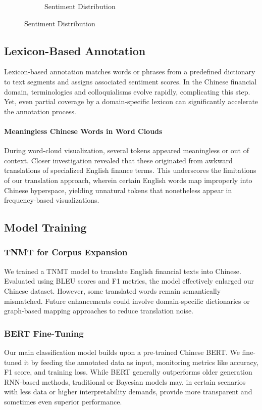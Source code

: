 \documentclass[12pt]{article}
\begin{document}
\begin{figure}[!ht]
\begin{subfigure}[b]{0.32\textwidth}
	\caption{Sentiment Distribution}
	\end{subfigure}
\end{figure}

\subsection{Lexicon-Based Annotation}

Lexicon-based annotation matches words or phrases from a predefined dictionary to text segments and assigns associated sentiment scores. In the Chinese financial domain, terminologies and colloquialisms evolve rapidly, complicating this step. Yet, even partial coverage by a domain-specific lexicon can significantly accelerate the annotation process. 

\paragraph{Meaningless Chinese Words in Word Clouds}
During word-cloud visualization, several tokens appeared meaningless or out of context. Closer investigation revealed that these originated from awkward translations of specialized English finance terms. This underscores the limitations of our translation approach, wherein certain English words map improperly into Chinese hyperspace, yielding unnatural tokens that nonetheless appear in frequency-based visualizations.


\subsection{Model Training}
\subsubsection{TNMT for Corpus Expansion}
\label{subsec:TNMTperf}
We trained a TNMT model to translate English financial texts into Chinese. Evaluated using BLEU scores and F1 metrics, the model effectively enlarged our Chinese dataset. However, some translated words remain semantically mismatched. Future enhancements could involve domain-specific dictionaries or graph-based mapping approaches to reduce translation noise.

\subsubsection{BERT Fine-Tuning}
Our main classification model builds upon a pre-trained Chinese BERT. We fine-tuned it by feeding the annotated data as input, monitoring metrics like accuracy, F1 score, and training loss. While BERT generally outperforms older generation RNN-based methods, traditional or Bayesian models may, in certain scenarios with less data or higher interpretability demands, provide more transparent and sometimes even superior performance.
\end{document}
